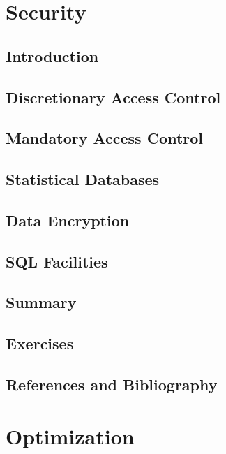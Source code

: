 \documentclass{book}
\begin{document}
\chapter{Security}

\section{Introduction}

\section{Discretionary Access Control}

\section{Mandatory Access Control}

\section{Statistical Databases}

\section{Data Encryption}

\section{SQL Facilities}

\section{Summary}

\section{Exercises}

\section{References and Bibliography}













\chapter{Optimization}
\end{document}
